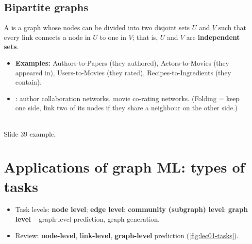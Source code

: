\subsection{Bipartite graphs}\label{sec:lec01-bipartite}

\begin{definition}\label{def:lec01-bipartite}
  A  is a graph whose nodes can be divided into two disjoint sets $U$
  and $V$ such that every link connects a node in $U$ to one in $V$; that is, $U$ and $V$
  are \textbf{independent sets}.
\end{definition}

\begin{minipage}[c]{0.7\linewidth}
\begin{itemize}
  \item \textbf{Examples:} Authors-to-Papers (they authored), Actors-to-Movies (they
    appeared in), Users-to-Movies (they rated), Recipes-to-Ingredients (they contain).
  \item {}: author collaboration networks, movie co-rating
    networks. (Folding = keep one side, link two of its nodes if they share a neighbour on
    the other side.)
\end{itemize}
\end{minipage}\hfill
\begin{minipage}[c]{0.26\linewidth}
  \centering
  \\[-2pt]
  {\footnotesize Slide 39 example.}
\end{minipage}

\section{Applications of graph ML: types of tasks}\label{sec:lec01-tasks}

\begin{itemize}
  \item Task levels: \textbf{node level}; \textbf{edge level}; \textbf{community
    (subgraph) level}; \textbf{graph level} -- graph-level prediction, graph generation.
  \item Review: \textbf{node-level}, \textbf{link-level}, \textbf{graph-level} prediction
    (\cref{fig:lec01-tasks}).
\end{itemize}

